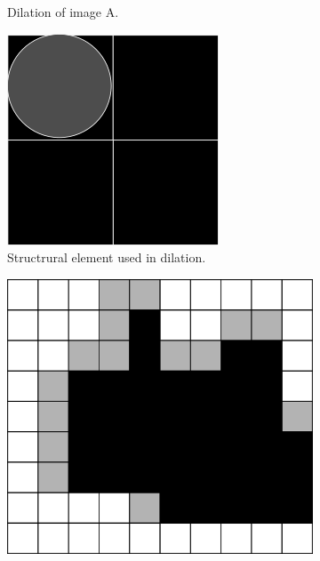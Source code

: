 \documentclass[
  digital,     %
  oneside,     %
  nosansbold,  %
  nocolorbold, %
  lof,         %
  lot,         %
]{fithesis4}
\begin{document}
\begin{figure}
\begin{subfigure}[t]{0.4\textwidth}
        \caption{Dilation of image A.}
        \label{fig:opening_erosion}
    \end{subfigure}
    \begin{subfigure}[t]{0.2\textwidth}
        \centering
        \includegraphics[width=\textwidth]{resources/inkscape/opening_erosion_se.png}
        \caption{Structrural element used in dilation.}
        \label{fig:opening_erosion_se}
    \end{subfigure}
    \begin{subfigure}[t]{0.4\textwidth}
        \centering
        \includegraphics[width=\textwidth]{resources/inkscape/closing_erosion.png}

\end{subfigure}
\end{figure}
\end{document}
